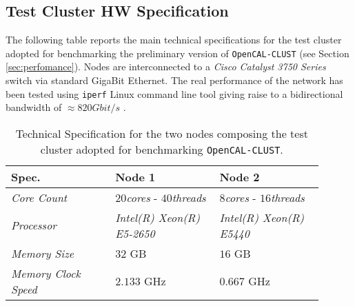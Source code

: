 \subsection{Test Cluster HW Specification}
The following table reports the main technical specifications for the test cluster adopted for benchmarking the preliminary version of  \texttt{OpenCAL-CLUST} (see Section \ref{sec:perfomance}).
Nodes are interconnected to a \textit{Cisco Catalyst 3750 Series} switch via standard GigaBit Ethernet.
The real performance of the network has been tested using \texttt{iperf} Linux command line tool giving raise to a bidirectional  bandwidth of $\approx 820 Gbit/s$  .
\begin{table}[H]
	\centering
	\caption{Technical Specification for the two nodes composing the test cluster adopted for benchmarking \texttt{OpenCAL-CLUST}.}
	\label{tab:tech_nodes}
	\begin{tabular}{m{0.3\linewidth} m{0.3\linewidth} m{0.3\linewidth}}
		\toprule
		{\textbf{Spec.}} & {\textbf{Node 1}} & {\textbf{Node 2}} \\
		\midrule
		\textit{Core Count}                & $20$\textit{cores} - $40$\textit{threads}   & $8$\textit{cores} - $16$\textit{threads}   \\
		\textit{Processor}                & \textit{Intel(R) Xeon(R) E5-2650}   & \textit{Intel(R) Xeon(R) E5440}   \\
		
		
		\midrule
		
		\textit{Memory Size}                & $32$ \si{GB}  & $16$ \si{GB}    \\
		
		\textit{Memory Clock Speed}                & $2.133$ \si{GHz}   & $0.667$ \si{GHz}    \\
		
		
		\bottomrule
	\end{tabular}
\end{table}



